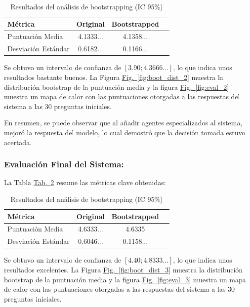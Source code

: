\documentclass[10pt]{llncs}
\newcommand{\figref}[1]{\hyperref[#1]{Fig.~\ref*{#1}}}
\newcommand{\tabref}[1]{\hyperref[#1]{Tab.~\ref*{#1}}}
\begin{document}
\begin{table}[h]
\centering
\caption{Resultados del análisis de bootstrapping (IC 95\%)}
\label{tab:boot_results_2}
\begin{tabular}{lccc}
\hline
\textbf{Métrica} & \textbf{Original} & \textbf{Bootstrapped}  \\
\hline 
Puntuación Media& 4.1333... & 4.1358...  \\
Desviación Estándar & 0.6182... & 0.1166...  \\
\hline
\end{tabular}
\end{table}

\begin{remark}
Se obtuvo un intervalo de confianza de $[3.90;4.3666...]$, lo que indica unos resultados bastante buenos. 
La Figura {\figref{fig:boot_dist_2}} muestra la distribución bootstrap de la puntuación media y la figura 
{\figref{fig:eval_2}} muestra un mapa de calor con las puntuaciones otorgadas a las respuestas del sistema a las 
30 preguntas iniciales.
\end{remark}

En resumen, se puede observar que al añadir agentes especializados al sistema, mejoró la respuesta del modelo, lo cual demostró 
que la decisión tomada estuvo acertada.

\subsubsection{Evaluación Final del Sistema:}

La Tabla \tabref{tab:boot_results_3} resume las métricas clave obtenidas:

\begin{table}[h]
\centering
\caption{Resultados del análisis de bootstrapping (IC 95\%)}
\label{tab:boot_results_3}
\begin{tabular}{lccc}
\hline
\textbf{Métrica} & \textbf{Original} & \textbf{Bootstrapped}  \\
\hline 
Puntuación Media& 4.6333... & 4.6335  \\
Desviación Estándar & 0.6046... & 0.1158...  \\
\hline
\end{tabular}
\end{table}

\begin{remark}
Se obtuvo un intervalo de confianza de $[4.40 ; 4.8333...]$, lo que indica unos resultados excelentes. 
La Figura {\figref{fig:boot_dist_3}} muestra la distribución bootstrap de la puntuación media y la figura 
{\figref{fig:eval_3}} muestra un mapa de calor con las puntuaciones otorgadas a las respuestas del sistema a las 
30 preguntas iniciales.
\end{remark}
\end{document}
